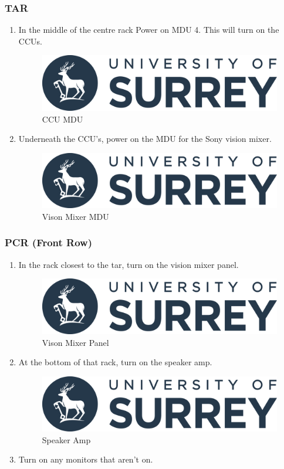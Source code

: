 \documentclass{report}
\begin{document}
\subsubsection{TAR}
          \begin{enumerate}
              \item In the middle of the centre rack Power on MDU 4. This will turn on the CCUs.
              \begin{figure}[h]
                \centering
                \includegraphics[width=.5\linewidth]{uos-logo.png}
                \caption{CCU MDU}
              \end{figure}
              \item Underneath the CCU's, power on the MDU for the Sony vision mixer.
              \begin{figure}[h]
                \centering
                \includegraphics[width=.5\linewidth]{uos-logo.png}
                \caption{Vison Mixer MDU}
              \end{figure}
          \end{enumerate}
\subsubsection{PCR (Front Row)}
          \begin{enumerate}
              \item In the rack closest to the \gls{tar}, turn on the vision mixer panel.
              \begin{figure}[h]
                \centering
                \includegraphics[width=.5\linewidth]{uos-logo.png}
                \caption{Vison Mixer Panel}
              \end{figure}
              \item At the bottom of that rack, turn on the speaker amp.
              \begin{figure}[h]
                \centering
                \includegraphics[width=.5\linewidth]{uos-logo.png}
                \caption{Speaker Amp}
              \end{figure}
              \item Turn on any monitors that aren't on.
          \end{enumerate}
\end{document}
